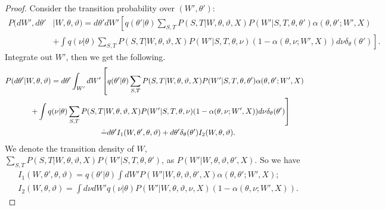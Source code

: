 \begin{proof}
Consider the transition probability over $(W',\theta')$:
\begin{align*}
  P(dW', d\theta'&| W, \theta, \vartheta)
=d\theta' dW' \left[q(\theta' | \theta)
  \sum_{S,T} P(S, T | W, \theta, \vartheta, X)P(W' | S, T, \theta, \theta')
\alpha(\theta, \theta' ; W', X)\right. \\
&\left.+ \int q(\nu | \theta) \sum_{S,T} P(S, T|W,\theta,\vartheta,
    X)P(W' | S, T, \theta, \nu) ( 1 - {\alpha(\theta, \nu ; W', X)})d\nu
    \delta_\theta(\theta')\right].
\end{align*}
Integrate out $W'$, then we get the following.
\begin{align*}
  P(d\theta'| W, \theta, \vartheta) =d\theta' \int_{W'}dW'&
  \left[q(\theta' | \theta)
    \sum_{S,T} P(S, T | W, \theta, \vartheta, X)P(W' | S, T, \theta,
  \theta')\alpha(\theta, \theta' ; W', X)\right.\\
  &\hspace{-1.3in}\left.  + \int q(\nu | \theta) \sum_{S,T} P(S, T |  W, \theta, \vartheta,
X)P(W' | S, T, \theta, \nu) ( 1 - \alpha(\theta, \nu ; W', X))d\nu
\delta_\theta(\theta')\right] \\
&\assign d\theta' I_1(W, \theta', \theta, \vartheta) + d\theta'\delta_\theta(\theta')I_2(W, \theta, \vartheta).
\end{align*}
We denote the transition density of $W$, $\sum_{S,T} P(S, T | W, \theta, \vartheta, X)P(W' | S, T, \theta, \theta')$, as $P(W' | W, \theta, \vartheta, \theta', X)$. So we have
\begin{align*}
&I_1(W, \theta', \theta, \vartheta) = q(\theta' | \theta)\int dW'P(W' | W, \theta, \vartheta, \theta', X)\alpha(\theta, \theta' ; W', X); \\
&I_2(W, \theta, \vartheta) =\int d\nu  dW'q(\nu | \theta)P(W' | W, \theta, \vartheta, \nu, X)(1 - \alpha(\theta, \nu ; W', X)).
\end{align*}


\end{proof}
